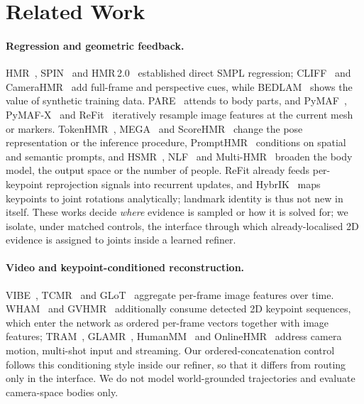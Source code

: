 \section{Related Work}
\label{sec:related}

\paragraph{Regression and geometric feedback.}
HMR~\cite{kanazawa2018hmr}, SPIN~\cite{kolotouros2019spin} and HMR\,2.0~\cite{goel2023hmr2} established direct SMPL regression; CLIFF~\cite{li2022cliff} and CameraHMR~\cite{patel2025camerahmr} add full-frame and perspective cues, while BEDLAM~\cite{black2023bedlam} shows the value of synthetic training data.
PARE~\cite{kocabas2021pare} attends to body parts, and PyMAF~\cite{zhang2021pymaf}, PyMAF-X~\cite{zhang2023pymafx} and ReFit~\cite{wang2023refit} iteratively resample image features at the current mesh or markers.
TokenHMR~\cite{dwivedi2024tokenhmr}, MEGA~\cite{fiche2025mega} and ScoreHMR~\cite{stathopoulos2024scorehmr} change the pose representation or the inference procedure, PromptHMR~\cite{wang2025prompthmr} conditions on spatial and semantic prompts, and HSMR~\cite{xia2025hsmr}, NLF~\cite{sarandi2024nlf} and Multi-HMR~\cite{baradel2024multihmr} broaden the body model, the output space or the number of people.
ReFit already feeds per-keypoint reprojection signals into recurrent updates, and HybrIK~\cite{li2021hybrik} maps keypoints to joint rotations analytically; landmark identity is thus not new in itself.
These works decide \emph{where} evidence is sampled or how it is solved for; we isolate, under matched controls, the interface through which already-localised 2D evidence is assigned to joints inside a learned refiner.

\paragraph{Video and keypoint-conditioned reconstruction.}
VIBE~\cite{kocabas2020vibe}, TCMR~\cite{choi2021tcmr} and GLoT~\cite{shen2023glot} aggregate per-frame image features over time.
WHAM~\cite{shin2024wham} and GVHMR~\cite{shen2024gvhmr} additionally consume detected 2D keypoint sequences, which enter the network as ordered per-frame vectors together with image features; TRAM~\cite{wang2024tram}, GLAMR~\cite{yuan2022glamr}, HumanMM~\cite{zhang2025humanmm} and OnlineHMR~\cite{zhao2026onlinehmr} address camera motion, multi-shot input and streaming.
Our ordered-concatenation control follows this conditioning style inside our refiner, so that it differs from routing only in the interface.
We do not model world-grounded trajectories and evaluate camera-space bodies only.

